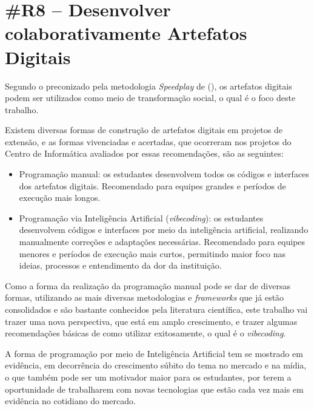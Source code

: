 \section*{\#R8 – Desenvolver colaborativamente Artefatos Digitais}

Segundo o preconizado pela metodologia \textit{Speedplay} de \citeauthor{ferrario2014} (\citeyear{ferrario2014}), os artefatos digitais podem ser utilizados como meio de transformação social, o qual é o foco deste trabalho. 

Existem diversas formas de construção de artefatos digitais em projetos de extensão, e as formas vivenciadas e acertadas, que ocorreram nos projetos do Centro de Informática avaliados por essas recomendações, são as seguintes:

\begin{itemize}
    \item Programação manual: os estudantes desenvolvem todos os códigos e interfaces dos artefatos digitais. Recomendado para equipes grandes e períodos de execução mais longos.
    \item Programação via Inteligência Artificial (\textit{vibecoding}): os estudantes desenvolvem códigos e interfaces por meio da inteligência artificial, realizando manualmente correções e adaptações necessárias. Recomendado para equipes menores e períodos de execução mais curtos, permitindo maior foco nas ideias, processos e entendimento da dor da instituição.
\end{itemize}

Como a forma da realização da programação manual pode se dar de diversas formas, utilizando as mais diversas metodologias e \textit{frameworks} que já estão consolidados e são bastante conhecidos pela literatura científica, este trabalho vai trazer uma nova perspectiva, que está em amplo crescimento, e trazer algumas recomendações básicas de como utilizar exitosamente, o qual é o \textit{vibecoding}.

A forma de programação por meio de Inteligência Artificial tem se mostrado em evidência, em decorrência do crescimento súbito do tema no mercado e na mídia, o que também pode ser um motivador maior para os estudantes, por terem a oportunidade de trabalharem com novas tecnologias que estão cada vez mais em evidência no cotidiano do mercado. 

